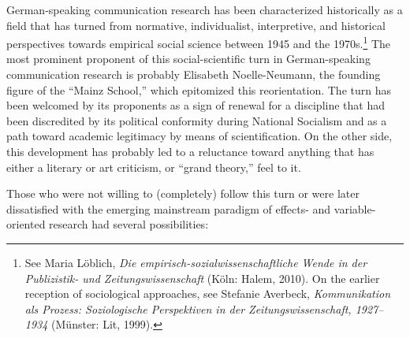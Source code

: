 \documentclass{tufte-handout}
\begin{document}
German-speaking communication research has been characterized
historically as a field that has turned from normative, individualist,
interpretive, and historical perspectives towards empirical social
science between 1945 and the 1970s.\footnote{See Maria Löblich,
  \emph{Die empirisch-sozialwissenschaftliche Wende in der Publizistik-
  und Zeitungswissenschaft} (Köln: Halem, 2010). On the earlier
  reception of sociological approaches, see Stefanie Averbeck,
  \emph{Kommunikation als Prozess: Soziologische Perspektiven in der
  Zeitungswissenschaft, 1927--1934} (Münster: Lit, 1999).} The most
prominent proponent of this social-scientific turn in German-speaking
communication research is probably Elisabeth Noelle-Neumann, the
founding figure of the ``Mainz School,'' which epitomized this
reorientation. The turn has been welcomed by its proponents as a sign of
renewal for a discipline that had been discredited by its political
conformity during National Socialism and as a path toward academic
legitimacy by means of scientification. On the other side, this
development has probably led to a reluctance toward anything that has
either a literary or art criticism, or ``grand theory,'' feel to it.

Those who were not willing to (completely) follow this turn or were
later dissatisfied with the emerging mainstream paradigm of effects- and
variable-oriented research had several possibilities:
\end{document}
